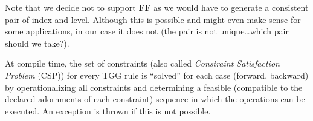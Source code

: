 Note that we decide not to support \textbf{FF} as we would have to generate a consistent pair of index and level.
Although this is possible and might even make sense for some applications, in our case it does not (the pair is not unique\ldots which pair should we take?).

At compile time, the set of constraints (also called \emph{Constraint Satisfaction Problem} (CSP)) for every TGG rule is ``solved'' for each case (forward,
backward) by operationalizing all constraints and determining a feasible (compatible to the declared adornments of each constraint) sequence in which the
operations can be executed. An exception is thrown if this is not possible.